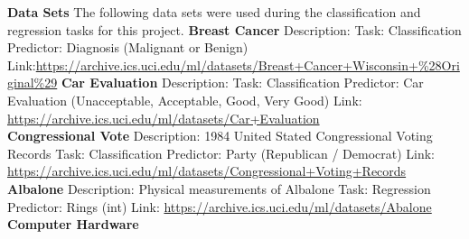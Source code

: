 \documentclass[twoside,11pt]{article}
\begin{document}
\begin{center}
\end{center}






\newpage
{\noindent}{\bf Data Sets}\newline
The following data sets were used during the classification and regression tasks for this project.\newline
{\bf Breast Cancer}\newline
Description: \newline
Task: Classification\newline
Predictor: Diagnosis (Malignant or Benign)\newline
Link:\newline \url{https://archive.ics.uci.edu/ml/datasets/Breast+Cancer+Wisconsin+%28Original%29}\newline
{\noindent}\textbf{Car Evaluation}\newline
Description:\newline
Task: Classification\newline
Predictor: Car Evaluation (Unacceptable, Acceptable, Good, Very Good)\newline
Link: \newline
\url{https://archive.ics.uci.edu/ml/datasets/Car+Evaluation}\\
{\noindent}\textbf{Congressional Vote}\newline
Description: 1984 United Stated Congressional Voting Records\newline
Task: Classification \newline
Predictor: Party (Republican / Democrat) \newline
Link: \newline
\url{https://archive.ics.uci.edu/ml/datasets/Congressional+Voting+Records}\newline
{\noindent}\textbf{Albalone}\newline
Description: Physical measurements of Albalone\newline
Task: Regression\newline
Predictor: Rings (int)\newline
Link: \newline
\url{https://archive.ics.uci.edu/ml/datasets/Abalone}\newline
{\noindent}\textbf{Computer Hardware}\newline
\end{document}
